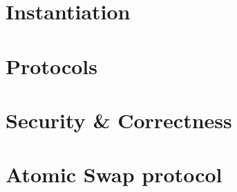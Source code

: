 \section{Instantiation}\label{sec:atom:inst}


\section{Protocols}\label{sec:atom:protocols}


\section{Security \& Correctness} \label{sec:atom:security}


\section{Atomic Swap protocol}\label{sec:atom:atomic-swap}
